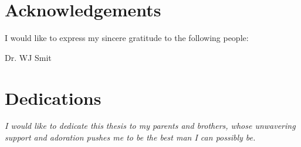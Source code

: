 \chapter{Acknowledgements}%

I would like to express my sincere gratitude to the following people:

Dr. WJ Smit

\chapter{Dedications}%

\vfill
\begin{center}\itshape%
  I would like to dedicate this thesis to my parents and brothers, whose unwavering support and adoration pushes me to be the best man I can possibly be. 
\end{center}
\vfill

\clearpage
	   
\endinput
